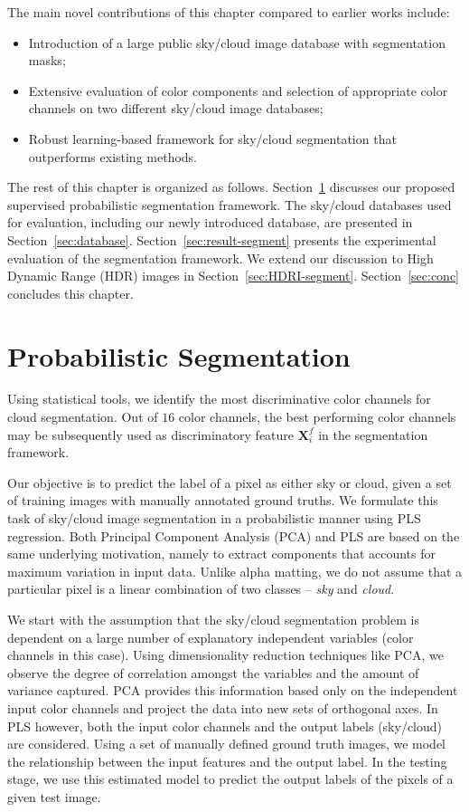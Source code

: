 The main novel contributions of this chapter compared to earlier works include: 

\begin{itemize}
\item Introduction of a large public sky/cloud image database with segmentation masks;
\item Extensive evaluation of color components and selection of appropriate color channels on two different sky/cloud image databases;
\item Robust learning-based framework for sky/cloud segmentation that outperforms existing methods.
\end{itemize}

The rest of this chapter is organized as follows. Section~\ref{sec:prob-segment} discusses our proposed supervised probabilistic segmentation framework. The sky/cloud databases used for evaluation, including our newly introduced database, are presented in Section~\ref{sec:database}. Section~\ref{sec:result-segment} presents the experimental evaluation of the segmentation framework. We extend our discussion to High Dynamic Range (HDR) images in Section~\ref{sec:HDRI-segment}. Section~\ref{sec:conc} concludes this chapter.


\section{Probabilistic Segmentation}
\label{sec:prob-segment}
Using statistical tools, we identify the most discriminative color channels for cloud segmentation. Out of $16$ color channels, the best performing color channels may be subsequently used as discriminatory feature $\mathbf{X}^{f}_{i}$ in the segmentation framework. 

Our objective is to predict the label of a pixel as either sky or cloud, given a set of training images with manually annotated ground truths. We formulate this task of sky/cloud image segmentation in a probabilistic manner using PLS regression. Both Principal Component Analysis (PCA) and PLS are based on the same underlying motivation, namely to extract components that accounts for maximum variation in input data. Unlike alpha matting, we do not assume that a particular pixel is a linear combination of two classes -- \emph{sky} and \emph{cloud}.

We start with the assumption that the sky/cloud segmentation problem is dependent on a large number of explanatory independent variables (color channels in this case). Using dimensionality reduction techniques like PCA, we observe the degree of correlation amongst the variables and the amount of variance captured. PCA provides this information based only on the independent input color channels and project the data into new sets of orthogonal axes. In PLS however, both the input color channels and the output labels (sky/cloud) are considered. Using a set of manually defined ground truth images, we model the relationship between the input features and the output label. In the testing stage, we use this estimated model to predict the output labels of the pixels of a given test image.

